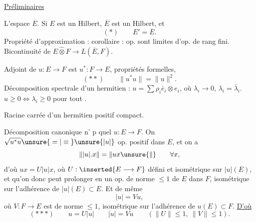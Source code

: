 
 \uline{Préliminaires}

L'espace $\overline E$. Si $E$ est un Hilbert, $\overline E$ est un Hilbert, et
\[
(*)\qquad \boxed{E'=\overline E}.
\]
Propriété d'approximation : corollaire : op.  sont limites d'op. de rang fini. Bicontinuité de $E\widehat\otimes F\longrightarrow L(\overline E,F)$.

Adjoint de $u:E\longrightarrow F$ est $u^*:F\longrightarrow E$, propriétés formelles, 
\[
(**)\qquad \boxed{\|u^*u\|=\|u\|^2}.
\]
Décomposition spectrale d'un hermitien  : $u=\sum\rho_i\overline e_i\otimes e_i$, où $\lambda_i\longrightarrow0$, $\lambda_i=\overline\lambda_i$.  $u\geq0\Longleftrightarrow\lambda_i\geq0$ pour tout .

Racine carrée d'un  hermitien positif compact.

Décomposition canonique  n' p quel $u:E\longrightarrow F$.
On   $\sqrt{u^*u}\unsure{{}={}|{}\equiv{}}\unsure{|u|}$ op. positif dans $E$, et on a
\[
\||u|.x\|=\|ux\unsure{\|}\qquad\forall x,
\]
d'où $ux=U|u|x$, où $U:\inserted{E\longrightarrow F}$ défini et isométrique sur $|u|(E)$, et qu'on donc peut prolonger en un op. de norme $\leq1$ de $E$ dans $F$, isométrique sur  l'adhérence de  $|u|(E)\subset E$. Et de même
\[
|u|=Vu,
\]
où $V:F\longrightarrow E$ est de norme $\leq1$, isométrique sur l'adhérence de $u(E)\subset F$. \uline{D'où}
\[
(***)\qquad\boxed{u=U|u|\qquad |u|=Vu}\qquad(\|U\|\leq1,\ \|V\|\leq1).
\]


